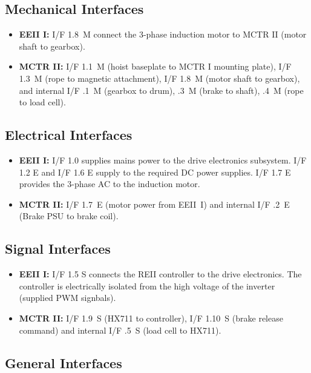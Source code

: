 \subsection{Mechanical Interfaces}
\label{subsec:mechanical-interfaces}
\begin{itemize}
    \item \textbf{EEII I:} I/F 1.8~M connect the 3-phase induction motor to MCTR II (motor shaft to gearbox).
    \item \textbf{MCTR II:} I/F 1.1~M (hoist baseplate to MCTR I mounting plate), I/F 1.3~M (rope to magnetic attachment), I/F 1.8~M (motor shaft to gearbox), and internal I/F \fuMII.1~M (gearbox to drum), \fuMII.3~M (brake to shaft), \fuMII.4~M (rope to load cell).
\end{itemize}

\subsection{Electrical Interfaces}
\label{subsec:electrical-interfaces}
\begin{itemize}
    \item \textbf{EEII I:} I/F 1.0 supplies mains power to the drive electronics subsystem. 
    I/F 1.2 E and I/F 1.6 E supply to the required DC power supplies. I/F 1.7 E provides the 3-phase AC to the
    induction motor.
    \item \textbf{MCTR II:} I/F 1.7~E (motor power from EEII~I) and internal I/F \fuMII.2~E (Brake PSU to brake coil).
\end{itemize}

\subsection{Signal Interfaces}
\label{subsec:signal-interfaces}
\begin{itemize}
    \item \textbf{EEII I:} I/F 1.5 S connects the REII controller to the drive electronics. The controller is
    electrically isolated from the high voltage of the inverter (supplied PWM signbals).
    \item \textbf{MCTR II:} I/F 1.9~S (HX711 to controller), I/F 1.10~S (brake release command) and internal I/F \fuMII.5~S (load cell to HX711).
\end{itemize}

\subsection{General Interfaces}
\label{subsec:general-interfaces}
